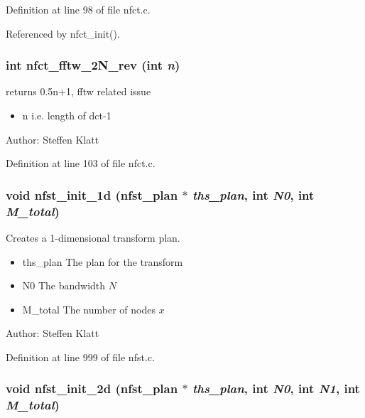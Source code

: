 Definition at line 98 of file nfct.c.

Referenced by nfct\_\-init().\hypertarget{group__nfsct_ge0f5cc8613123ec5bbab8c7b728255d1}{
\subsubsection{\setlength{\rightskip}{0pt plus 5cm}int nfct\_\-fftw\_\-2N\_\-rev (int {\em n})}}
\label{group__nfsct_ge0f5cc8613123ec5bbab8c7b728255d1}


returns 0.5n+1, fftw related issue 

\begin{itemize}
\item n i.e. length of dct-1\end{itemize}
\begin{Desc}
\item[Author:]Steffen Klatt \end{Desc}


Definition at line 103 of file nfct.c.\hypertarget{group__nfsct_gc13a4c85f5cd43cfc3b5c3895021a9a9}{
\subsubsection{\setlength{\rightskip}{0pt plus 5cm}void nfst\_\-init\_\-1d ({\bf nfst\_\-plan} $\ast$ {\em ths\_\-plan}, int {\em N0}, int {\em M\_\-total})}}
\label{group__nfsct_gc13a4c85f5cd43cfc3b5c3895021a9a9}


Creates a 1-dimensional transform plan. 

\begin{itemize}
\item ths\_\-plan The plan for the transform \item N0 The bandwidth $N$ \item M\_\-total The number of nodes $x$\end{itemize}
\begin{Desc}
\item[Author:]Steffen Klatt \end{Desc}


Definition at line 999 of file nfst.c.\hypertarget{group__nfsct_g44eff771382180419936a6dbf51505fa}{
\subsubsection{\setlength{\rightskip}{0pt plus 5cm}void nfst\_\-init\_\-2d ({\bf nfst\_\-plan} $\ast$ {\em ths\_\-plan}, int {\em N0}, int {\em N1}, int {\em M\_\-total})}}
\label{group__nfsct_g44eff771382180419936a6dbf51505fa}


